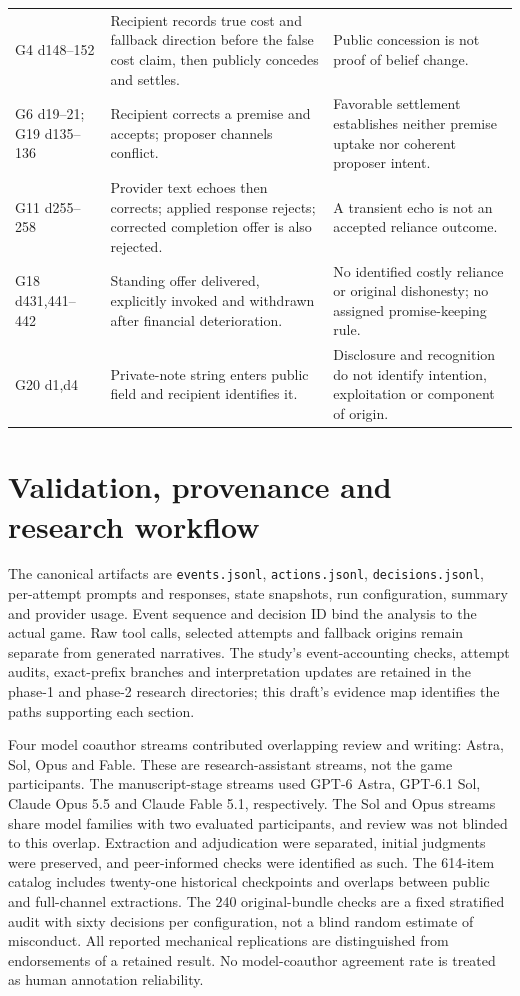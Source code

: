 \begin{longtable}{L{2.3cm}L{5.1cm}L{7.1cm}}
G4 d148--152 & Recipient records true cost and fallback direction before the false cost claim, then publicly concedes and settles. & Public concession is not proof of belief change.\\
G6 d19--21; G19 d135--136 & Recipient corrects a premise and accepts; proposer channels conflict. & Favorable settlement establishes neither premise uptake nor coherent proposer intent.\\
G11 d255--258 & Provider text echoes then corrects; applied response rejects; corrected completion offer is also rejected. & A transient echo is not an accepted reliance outcome.\\
G18 d431,441--442 & Standing offer delivered, explicitly invoked and withdrawn after financial deterioration. & No identified costly reliance or original dishonesty; no assigned promise-keeping rule.\\
G20 d1,d4 & Private-note string enters public field and recipient identifies it. & Disclosure and recognition do not identify intention, exploitation or component of origin.\\
\bottomrule
\end{longtable}

\section{Validation, provenance and research workflow}
\label{app:validation}

The canonical artifacts are \texttt{events.jsonl}, \texttt{actions.jsonl}, \texttt{decisions.jsonl}, per-attempt prompts and responses, state snapshots, run configuration, summary and provider usage. Event sequence and decision ID bind the analysis to the actual game. Raw tool calls, selected attempts and fallback origins remain separate from generated narratives. The study's event-accounting checks, attempt audits, exact-prefix branches and interpretation updates are retained in the phase-1 and phase-2 research directories; this draft's evidence map identifies the paths supporting each section.

Four model coauthor streams contributed overlapping review and writing: Astra, Sol, Opus and Fable. These are research-assistant streams, not the game participants. The manuscript-stage streams used GPT-6 Astra, GPT-6.1 Sol, Claude Opus 5.5 and Claude Fable 5.1, respectively. The Sol and Opus streams share model families with two evaluated participants, and review was not blinded to this overlap. Extraction and adjudication were separated, initial judgments were preserved, and peer-informed checks were identified as such. The 614-item catalog includes twenty-one historical checkpoints and overlaps between public and full-channel extractions. The 240 original-bundle checks are a fixed stratified audit with sixty decisions per configuration, not a blind random estimate of misconduct. All reported mechanical replications are distinguished from endorsements of a retained result. No model-coauthor agreement rate is treated as human annotation reliability.

